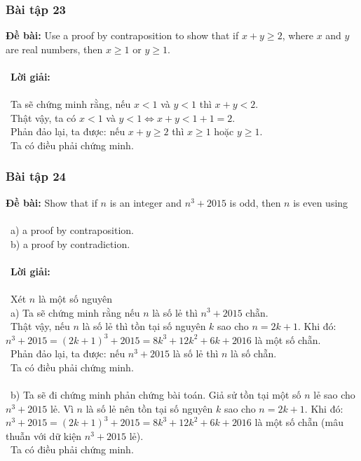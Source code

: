 \documentclass[a4paper]{article}
\begin{document}
\subsubsection{Bài tập 23}
\textbf{Đề bài: } Use a proof by contraposition to show that if $x + y \geq 2$, where $x$ and $y$ are real numbers, then $x \geq 1$ or $y \geq 1$.\\\ \\\
\textbf{Lời giải:} \\\ \\\
Ta sẽ chứng minh rằng, nếu $x < 1$ và $y < 1$ thì $x+y< 2$. \\\
Thật vậy, ta có $x < 1$ và $y < 1 \Leftrightarrow x+y < 1+1 = 2$. \\\
Phản đảo lại, ta được: nếu $x+y \geq 2$ thì $x \geq 1$ hoặc $y \geq 1$. \\\
Ta có điều phải chứng minh.

\clearpage
\subsubsection{Bài tập 24}
\textbf{Đề bài: } Show that if $n$ is an integer and $n^3 + 2015$ is odd, then $n$ is even using \\\ \\\
a) a proof by contraposition. \\\
b) a proof by contradiction.\\\ \\\
\textbf{Lời giải:} \\\ \\\
Xét $n$ là một số nguyên \\\
a) Ta sẽ chứng minh rằng nếu $n$ là số lẻ thì $n^3 + 2015$ chẵn. \\\
Thật vậy, nếu $n$ là số lẻ thì tồn tại số nguyên $k$ sao cho $n = 2k+1$. Khi đó: $n^3+2015 = (2k+1)^3+2015=8k^3 + 12k^2+6k + 2016$ là một số chẵn.\\\
Phản đảo lại, ta được: nếu $n^3+2015$ là số lẻ thì $n$ là số chẵn. \\\
Ta có điều phải chứng minh. \\\ \\\
b) Ta sẽ đi chứng minh phản chứng bài toán. Giả sử tồn tại một số $n$ lẻ sao cho $n^3+2015$ lẻ. Vì $n$ là số lẻ nên tồn tại số nguyên $k$ sao cho $n = 2k+1$. Khi đó: $n^3+2015 = (2k+1)^3+2015=8k^3 + 12k^2+6k + 2016$ là một số chẵn (mâu thuẫn với dữ kiện $n^3 + 2015$ lẻ). \\\
Ta có điều phải chứng minh.

\clearpage
\end{document}
